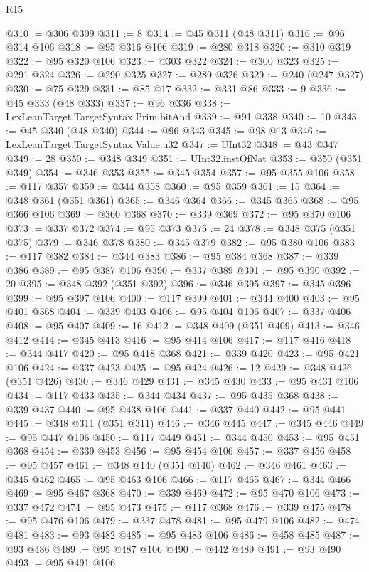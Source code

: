 \begin{lexlean}{R15}
\begin{coremodule}
@310 := @306 @309
@311 := 8
@314 := @45 @311 (@48 @311)
@316 := @96 @314 @106
@318 := @95 @316 @106
@319 := @280 @318
@320 := @310 @319
@322 := @95 @320 @106
@323 := @303 @322
@324 := @300 @323
@325 := @291 @324
@326 := @290 @325
@327 := @289 @326
@329 := @240 (@247 @327)
@330 := @75 @329
@331 := @85 @17
@332 := @331 @86
@333 := 9
@336 := @45 @333 (@48 @333)
@337 := @96 @336
@338 := LexLeanTarget.TargetSyntax.Prim.bitAnd
@339 := @91 @338
@340 := 10
@343 := @45 @340 (@48 @340)
@344 := @96 @343
@345 := @98 @13
@346 := LexLeanTarget.TargetSyntax.Value.u32
@347 := UInt32
@348 := @43 @347
@349 := 28
@350 := @348 @349
@351 := UInt32.instOfNat
@353 := @350 (@351 @349)
@354 := @346 @353
@355 := @345 @354
@357 := @95 @355 @106
@358 := @117 @357
@359 := @344 @358
@360 := @95 @359
@361 := 15
@364 := @348 @361 (@351 @361)
@365 := @346 @364
@366 := @345 @365
@368 := @95 @366 @106
@369 := @360 @368
@370 := @339 @369
@372 := @95 @370 @106
@373 := @337 @372
@374 := @95 @373
@375 := 24
@378 := @348 @375 (@351 @375)
@379 := @346 @378
@380 := @345 @379
@382 := @95 @380 @106
@383 := @117 @382
@384 := @344 @383
@386 := @95 @384 @368
@387 := @339 @386
@389 := @95 @387 @106
@390 := @337 @389
@391 := @95 @390
@392 := 20
@395 := @348 @392 (@351 @392)
@396 := @346 @395
@397 := @345 @396
@399 := @95 @397 @106
@400 := @117 @399
@401 := @344 @400
@403 := @95 @401 @368
@404 := @339 @403
@406 := @95 @404 @106
@407 := @337 @406
@408 := @95 @407
@409 := 16
@412 := @348 @409 (@351 @409)
@413 := @346 @412
@414 := @345 @413
@416 := @95 @414 @106
@417 := @117 @416
@418 := @344 @417
@420 := @95 @418 @368
@421 := @339 @420
@423 := @95 @421 @106
@424 := @337 @423
@425 := @95 @424
@426 := 12
@429 := @348 @426 (@351 @426)
@430 := @346 @429
@431 := @345 @430
@433 := @95 @431 @106
@434 := @117 @433
@435 := @344 @434
@437 := @95 @435 @368
@438 := @339 @437
@440 := @95 @438 @106
@441 := @337 @440
@442 := @95 @441
@445 := @348 @311 (@351 @311)
@446 := @346 @445
@447 := @345 @446
@449 := @95 @447 @106
@450 := @117 @449
@451 := @344 @450
@453 := @95 @451 @368
@454 := @339 @453
@456 := @95 @454 @106
@457 := @337 @456
@458 := @95 @457
@461 := @348 @140 (@351 @140)
@462 := @346 @461
@463 := @345 @462
@465 := @95 @463 @106
@466 := @117 @465
@467 := @344 @466
@469 := @95 @467 @368
@470 := @339 @469
@472 := @95 @470 @106
@473 := @337 @472
@474 := @95 @473
@475 := @117 @368
@476 := @339 @475
@478 := @95 @476 @106
@479 := @337 @478
@481 := @95 @479 @106
@482 := @474 @481
@483 := @93 @482
@485 := @95 @483 @106
@486 := @458 @485
@487 := @93 @486
@489 := @95 @487 @106
@490 := @442 @489
@491 := @93 @490
@493 := @95 @491 @106

\end{coremodule}
\end{lexlean}
